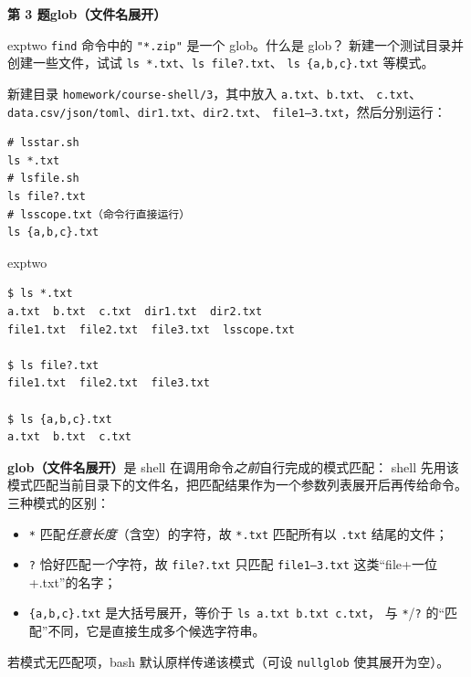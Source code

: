 \documentclass[11pt,a4paper,fontset=none]{ctexart}
\newcommand{\hwbanner}[3]{%
  \par\vspace{1.1em}
  \begin{tcolorbox}[enhanced, colback=#1!8, colframe=#1!75!black,
    boxrule=0.8pt, arc=2pt, left=7pt, right=7pt, top=4pt, bottom=4pt,
    before skip=1.1em]
    {\bfseries\color{#1!75!black}#2\qquad #3}
  \end{tcolorbox}
  \par\vspace{0.1em}\noindent\ignorespaces
}
\newcommand{\sublabel}[2]{%
  \par\vspace{0.8em}\noindent{\bfseries\color{#1!75!black}#2}\par\nobreak\vspace{0.25em}\noindent\ignorespaces
}
\begin{document}
\hwbanner{exptwo}{第 3 题}{glob（文件名展开）}
\begin{reqbox}{exptwo}
  \texttt{find} 命令中的 \texttt{"*.zip"} 是一个 glob。什么是 glob？
  新建一个测试目录并创建一些文件，试试 \texttt{ls *.txt}、\texttt{ls file?.txt}、
  \texttt{ls \{a,b,c\}.txt} 等模式。
\end{reqbox}
\sublabel{exptwo}{\faTerminal\ 操作（\texttt{3/} 目录）}
新建目录 \texttt{homework/course-shell/3}，其中放入 \texttt{a.txt}、\texttt{b.txt}、
\texttt{c.txt}、\texttt{data.csv/json/toml}、\texttt{dir1.txt}、\texttt{dir2.txt}、
\texttt{file1--3.txt}，然后分别运行：
\begin{lstlisting}[style=shell]
# lsstar.sh
ls *.txt
# lsfile.sh
ls file?.txt
# lsscope.txt（命令行直接运行）
ls {a,b,c}.txt
\end{lstlisting}
\begin{resbox}{exptwo}
\begin{lstlisting}[style=output]
$ ls *.txt
a.txt  b.txt  c.txt  dir1.txt  dir2.txt
file1.txt  file2.txt  file3.txt  lsscope.txt

$ ls file?.txt
file1.txt  file2.txt  file3.txt

$ ls {a,b,c}.txt
a.txt  b.txt  c.txt
\end{lstlisting}
\textbf{glob（文件名展开）}是 shell 在调用命令\emph{之前}自行完成的模式匹配：
shell 先用该模式匹配当前目录下的文件名，把匹配结果作为一个参数列表展开后再传给命令。
三种模式的区别：
\begin{itemize}[leftmargin=1.4em, itemsep=1pt]
  \item \texttt{*} 匹配\emph{任意长度}（含空）的字符，故 \texttt{*.txt} 匹配所有以
        \texttt{.txt} 结尾的文件；
  \item \texttt{?} 恰好匹配\emph{一个}字符，故 \texttt{file?.txt} 只匹配
        \texttt{file1--3.txt} 这类“file+一位+.txt”的名字；
  \item \texttt{\{a,b,c\}.txt} 是大括号展开，等价于 \texttt{ls a.txt b.txt c.txt}，
        与 \texttt{*}/\texttt{?} 的“匹配”不同，它是直接生成多个候选字符串。
\end{itemize}
若模式无匹配项，bash 默认原样传递该模式（可设 \texttt{nullglob} 使其展开为空）。
\end{resbox}
\end{document}
